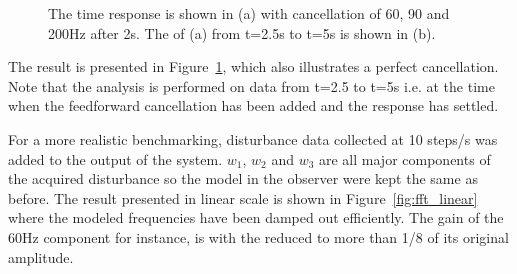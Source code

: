 \begin{figure}[h!]
  \centering %
  \qquad
  \caption{\label{fig:3_dist_both} The time response is shown in (a) with cancellation of 60, 90 and 200Hz after 2s. The \abbrFFT of (a) from t=2.5s to t=5s is shown in (b).}
\end{figure}

The result is presented in Figure~\ref{fig:3_dist_both}, which also illustrates a perfect cancellation. Note that the \abbrFFT analysis is performed on data from t=2.5 to t=5s i.e. at the time when the feedforward cancellation has been added and the response has settled.

For a more realistic benchmarking, disturbance data collected at 10 steps/s was added to the output of the system. $w_1$, $w_2$ and $w_3$ are all major components of the acquired disturbance so the model in the observer were kept the same as before. The result presented in linear scale is shown in Figure~\ref{fig:fft_linear} where the modeled frequencies have been damped out efficiently. The gain of the 60Hz component for instance, is with the \abbrRFDC reduced to more than 1/8 of its original amplitude.

